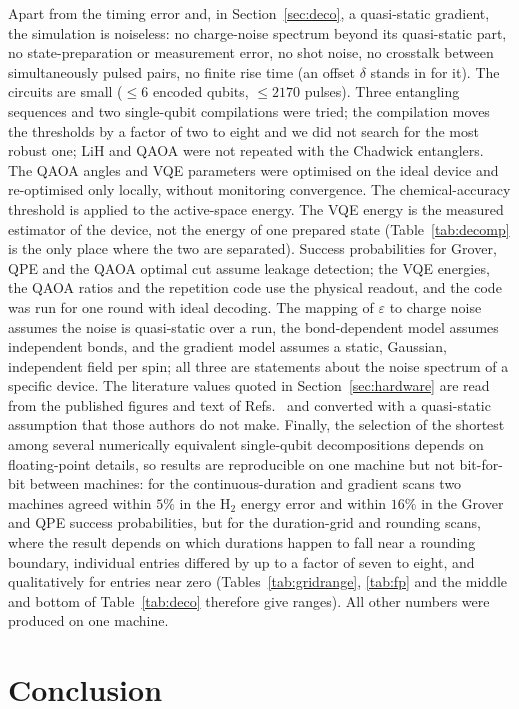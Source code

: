 \documentclass[reprint,aps,pra,amsmath,amssymb,superscriptaddress,letterpaper]{revtex4-2}
\newcommand{\Hz}{\mathrm{H}_2}
\begin{document}
Apart from the timing error and, in Section~\ref{sec:deco}, a quasi-static
gradient, the simulation is noiseless: no charge-noise spectrum beyond its
quasi-static part, no state-preparation or measurement error, no shot noise,
no crosstalk between simultaneously pulsed pairs, no finite rise time (an
offset $\delta$ stands in for it). The circuits are small ($\le6$ encoded
qubits, $\le2170$ pulses). Three entangling sequences and two single-qubit
compilations were tried; the compilation moves the thresholds by a factor of two to eight and we did not search for the most robust one; LiH and QAOA were not repeated with the Chadwick entanglers. The QAOA angles and VQE
parameters were optimised on the ideal device and re-optimised only locally,
without monitoring convergence. The chemical-accuracy threshold is applied to
the active-space energy. The VQE energy is the measured estimator of the
device, not the energy of one prepared state (Table~\ref{tab:decomp} is the
only place where the two are separated). Success probabilities for Grover, QPE and the QAOA optimal cut assume leakage detection; the VQE energies, the QAOA ratios and the repetition code use the physical readout, and the code was run for one round with ideal decoding.
The mapping of $\varepsilon$ to charge noise assumes the noise is quasi-static
over a run, the bond-dependent model assumes independent bonds, and the
gradient model assumes a static, Gaussian, independent field per spin; all
three are statements about the noise spectrum of a specific device. The
literature values quoted in Section~\ref{sec:hardware} are read from the published figures and text of Refs.~\cite{andrews2019,weinstein2023} and converted with a quasi-static assumption that those authors do not make. Finally, the selection of the shortest among several numerically equivalent single-qubit decompositions depends on floating-point details, so results are reproducible on one machine but not bit-for-bit between machines: for the continuous-duration and gradient scans two machines agreed within $5\%$ in the $\Hz$ energy error and within $16\%$ in the Grover and QPE success probabilities, but for the duration-grid and rounding scans, where the result depends on which durations happen to fall near a rounding boundary, individual entries differed by up to a factor of seven to eight, and qualitatively for entries near zero (Tables~\ref{tab:gridrange}, \ref{tab:fp} and the middle and bottom of Table~\ref{tab:deco} therefore give ranges). All other numbers were produced on one machine.

\section{Conclusion}
\end{document}
